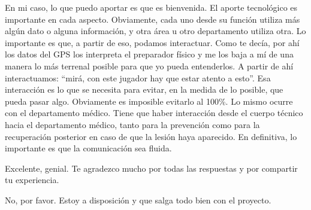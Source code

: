 \begin{description}[leftmargin=0pt, itemindent=\parindent, labelsep=0.5em, itemsep=0pt, parsep=0pt, topsep=0pt]
    \item[\textbf{Leonardo Lemos:}] En mi caso, lo que puedo aportar es que es bienvenida. El aporte tecnológico es importante en cada aspecto. Obviamente, cada uno desde su función utiliza más algún dato o alguna información, y otra área u otro departamento utiliza otra. Lo importante es que, a partir de eso, podamos interactuar. Como te decía, por ahí los datos del GPS los interpreta el preparador físico y me los baja a mí de una manera lo más terrenal posible para que yo pueda entenderlos. A partir de ahí interactuamos: ``mirá, con este jugador hay que estar atento a esto''. Esa interacción es lo que se necesita para evitar, en la medida de lo posible, que pueda pasar algo. Obviamente es imposible evitarlo al 100\%. Lo mismo ocurre con el departamento médico. Tiene que haber interacción desde el cuerpo técnico hacia el departamento médico, tanto para la prevención como para la recuperación posterior en caso de que la lesión haya aparecido. En definitiva, lo importante es que la comunicación sea fluida.

    \item[\textbf{Entrevistador:}] Excelente, genial. Te agradezco mucho por todas las respuestas y por compartir tu experiencia.

    \item[\textbf{Leonardo Lemos:}] No, por favor. Estoy a disposición y que salga todo bien con el proyecto.
\end{description}

